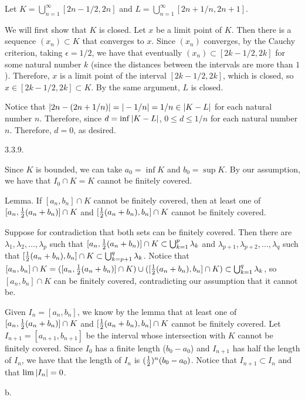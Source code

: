 Let $K = \bigcup _{n=1} ^\infty [2n - 1/2, 2n]$
and $L = \bigcup _{n=1} ^\infty [2n + 1/n, 2n + 1]$.

We will first show that $K$ is closed.
Let $x$ be a limit point of $K$.
Then there is a sequence $(x_n) \subset K$ that converges to $x$.
Since $(x_n)$ converges, by the Cauchy criterion,
taking $\epsilon = 1/2$, we have that eventually
$(x_n) \subset [2k - 1/2, 2k]$ for some natural number $k$
(since the distances between the intervals are more than $1$).
Therefore, $x$ is a limit point of the interval $[2k - 1/2, 2k]$,
which is closed, so $x \in [2k - 1/2, 2k] \subset K$.
By the same argument, $L$ is closed.

Notice that $\vert2n - (2n + 1/n)\vert = \vert-1/n\vert = 1/n \in \vert K - L\vert$
for each natural number $n$.
Therefore, since $d = \inf \vert K - L\vert$,
$0 \le d \le 1/n$ for each natural number $n$.
Therefore, $d = 0$, as desired.
\bigskip
\item{3.3.9.}

Since $K$ is bounded, we can take $a_0 = \inf K$ and $b_0 = \sup K$.
By our assumption, we have that $I_0 \cap K = K$
cannot be finitely covered.

\proclaim Lemma. If $[a_n, b_n] \cap K$ cannot be finitely covered,
then at least one of $[a_n, {1 \over 2}(a_n + b_n)] \cap K$ and
$[{1 \over 2}(a_n + b_n), b_n] \cap K$ cannot be finitely covered.

Suppose for contradiction that both sets can be finitely covered.
Then there are $\lambda _1, \lambda _2, \ldots, \lambda _p$ such that
$[a_n, {1 \over 2}(a_n + b_n)] \cap K \subset \bigcup _{k=1} ^p \lambda _k$
and $\lambda _{p+1}, \lambda _{p+2}, \ldots, \lambda _q$ such that
$[{1 \over 2}(a_n + b_n), b_n] \cap K \subset \bigcup _{k=p+1} ^q \lambda _k$.
Notice that
$[a_n, b_n] \cap K = ([a_n, {1 \over 2}(a_n + b_n)] \cap K) \cup
([{1 \over 2}(a_n + b_n), b_n] \cap K) \subset \bigcup _{k=1} ^q \lambda _k$,
so $[a_n, b_n] \cap K$ can be finitely covered,
contradicting our assumption that it cannot be.

Given $I_n = [a_n, b_n]$, we know by the lemma that
at least one of $[a_n, {1 \over 2}(a_n + b_n)] \cap K$ and
$[{1 \over 2}(a_n + b_n), b_n] \cap K$ cannot be finitely covered.
Let $I_{n+1} = [a_{n+1}, b_{n+1}]$ be the interval
whose intersection with $K$ cannot be finitely covered.
Since $I_0$ has a finite length ($b_0 - a_0$)
and $I_{n+1}$ has half the length of $I_n$,
we have that the length of $I_n$ is $({1 \over 2})^n (b_0 - a_0)$.
Notice that $I_{n+1} \subset I_n$ and that $\lim \vert I_n\vert = 0$.
\medskip
\item{} b.

